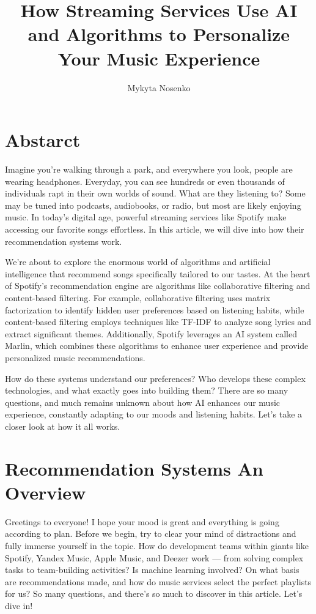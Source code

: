 \documentclass[14pt,a4paper]{article}
\title{How Streaming Services Use AI and Algorithms to Personalize Your Music Experience}
\author{Mykyta Nosenko}
\begin{document}
\maketitle
\section*{Abstarct}

Imagine you’re walking through a park, and everywhere you look, people are wearing headphones. Everyday, you can see hundreds or even thousands of individuals rapt in their own worlds of sound. What are they listening to? Some may be tuned into podcasts, audiobooks, or radio, but most are likely enjoying music. In today’s digital age, powerful streaming services like Spotify make accessing our favorite songs effortless. In this article, we will dive into how their recommendation systems work.

We’re about to explore the enormous world of algorithms and artificial intelligence that recommend songs specifically tailored to our tastes. At the heart of Spotify’s recommendation engine are algorithms like collaborative filtering and content-based filtering. For example, collaborative filtering uses matrix factorization to identify hidden user preferences based on listening habits, while content-based filtering employs techniques like TF-IDF to analyze song lyrics and extract significant themes. Additionally, Spotify leverages an AI system called Marlin, which combines these algorithms to enhance user experience and provide personalized music recommendations\citep{href}.

How do these systems understand our preferences? Who develops these complex technologies, and what exactly goes into building them? There are so many questions, and much remains unknown about how AI enhances our music experience, constantly adapting to our moods and listening habits. Let's take a closer look at how it all works.

\newpage
\tableofcontents
\newpage

\section{Recommendation Systems An Overview}



Greetings to everyone! I hope your mood is great and everything is going according to plan. Before we begin, try to clear your mind of distractions and fully immerse yourself in the topic. How do development teams within giants like Spotify, Yandex Music, Apple Music, and Deezer work — from solving complex tasks to team-building activities? Is machine learning involved? On what basis are recommendations made, and how do music services select the perfect playlists for us? So many questions, and there's so much to discover in this article. Let's dive in!
\end{document}
